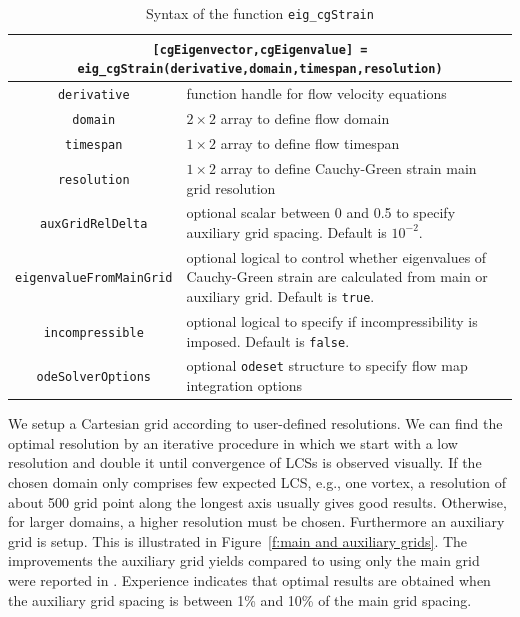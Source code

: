 \documentclass{article}
\begin{document}
\begin{table}
\begin{center}
\begin{tabular}{|c|p{}|}
\hline \hline
\multicolumn{2}{|p{\textwidth}|}{\lstinline![cgEigenvector,cgEigenvalue] = eig_cgStrain(derivative,domain,timespan,resolution)!}\\
\hline
\lstinline!derivative! & function handle for flow velocity equations\\
\hline
\lstinline!domain! & $2 \times 2$ array to define flow domain\\
\hline
\lstinline!timespan! & $1 \times 2$ array to define flow timespan\\
\hline
\lstinline!resolution! & $1 \times 2$ array to define Cauchy-Green strain main grid resolution\\
\hline
\lstinline!auxGridRelDelta! & optional scalar between 0 and 0.5 to specify auxiliary grid spacing. Default is $10^{-2}$.\\
\hline
\lstinline!eigenvalueFromMainGrid! & optional logical to control whether eigenvalues of Cauchy-Green strain are calculated from main or auxiliary grid. Default is \lstinline!true!.\\
\hline
\lstinline!incompressible! & optional logical to specify if incompressibility is imposed. Default is \lstinline!false!.\\
\hline
\lstinline!odeSolverOptions! & optional \lstinline!odeset! structure to specify flow map integration options\\
\hline \hline
\end{tabular}
\caption{Syntax of the function \lstinline!eig_cgStrain!}
\label{t:eig_cgStrain syntax}
\end{center}
\end{table}

We setup a Cartesian grid according to user-defined resolutions. We can find the optimal resolution by an iterative procedure in which we start with a low resolution and double it until convergence of LCSs is observed visually. If the chosen domain only comprises few expected LCS, e.g., one vortex, a resolution of about 500 grid point along the longest axis usually gives good results. Otherwise, for larger domains, a higher resolution must be chosen. Furthermore an auxiliary grid is setup. This is illustrated in Figure~\ref{f:main and auxiliary grids}. The improvements the auxiliary grid yields compared to using only the main grid were reported in \textcite{farazmand12:_comput_lagran}. Experience indicates that optimal results are obtained when the auxiliary grid spacing is between 1\% and 10\% of the main grid spacing.
\end{document}
